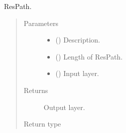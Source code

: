 \documentclass[letterpaper,10pt,english]{sphinxmanual}
\begin{document}
\begin{fulllineitems}
\label{\detokenize{models/multiresunet:models.multiresunet.ResPath}}
ResPath.
\begin{quote}\begin{description}
\item[{Parameters}] \leavevmode\begin{itemize}
\item {} 
 () \textendash{} Description.

\item {} 
 () \textendash{} Length of ResPath.

\item {} 
 () \textendash{} Input layer.

\end{itemize}

\item[{Returns}] \leavevmode
{} \textendash{} Output layer.

\item[{Return type}] \leavevmode
{}

\end{description}\end{quote}

\end{fulllineitems}

\end{document}
